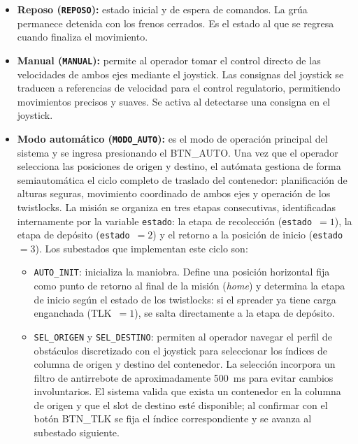 \begin{itemize}
    \item \textbf{Reposo (\texttt{REPOSO}):} estado inicial y de espera de comandos. La grúa
    permanece detenida con los frenos cerrados. Es el estado al que se regresa cuando finaliza el movimiento.

    \item \textbf{Manual (\texttt{MANUAL}):} permite al operador tomar el control directo de las
    velocidades de ambos ejes mediante el joystick. Las consignas del joystick se traducen a
    referencias de velocidad para el control regulatorio, permitiendo movimientos precisos y
    suaves. Se activa al detectarse una consigna en el joystick.

    \item \textbf{Modo automático (\texttt{MODO\_AUTO}):} es el modo de operación principal del
    sistema y se ingresa presionando el \textcolor{signalcolor}{BTN\_AUTO}. Una vez que el operador 
    selecciona las posiciones de origen y destino, el autómata
    gestiona de forma semiautomática el ciclo completo de traslado del contenedor: planificación de
    alturas seguras, movimiento coordinado de ambos ejes y operación de los twistlocks. La misión
    se organiza en tres etapas consecutivas, identificadas internamente por la variable
    \texttt{estado}: la etapa de recolección (\texttt{estado}~$= 1$), la etapa de depósito
    (\texttt{estado}~$= 2$) y el retorno a la posición de inicio (\texttt{estado}~$= 3$). Los subestados que implementan
    este ciclo son:

    \begin{itemize}
        \item \texttt{AUTO\_INIT}: inicializa la maniobra. Define una posición horizontal fija
        como punto de retorno al final de la misión (\textit{home}) y determina la
        etapa de inicio según el estado de los twistlocks: si el spreader ya tiene carga
        enganchada (\textcolor{signalcolor}{TLK}~$= 1$), se salta directamente a la etapa de
        depósito.

        \item \texttt{SEL\_ORIGEN} y \texttt{SEL\_DESTINO}: permiten al operador navegar el
        perfil de obstáculos discretizado con el joystick para seleccionar los índices de
        columna de origen y destino del contenedor. La selección incorpora un filtro de
        antirrebote de aproximadamente 500~ms para evitar cambios involuntarios. El sistema
        valida que exista un contenedor en la columna de origen y que el slot de destino esté
        disponible; al confirmar con el botón \textcolor{signalcolor}{BTN\_TLK} se fija el
        índice correspondiente y se avanza al subestado siguiente.


\end{itemize}
\end{itemize}
